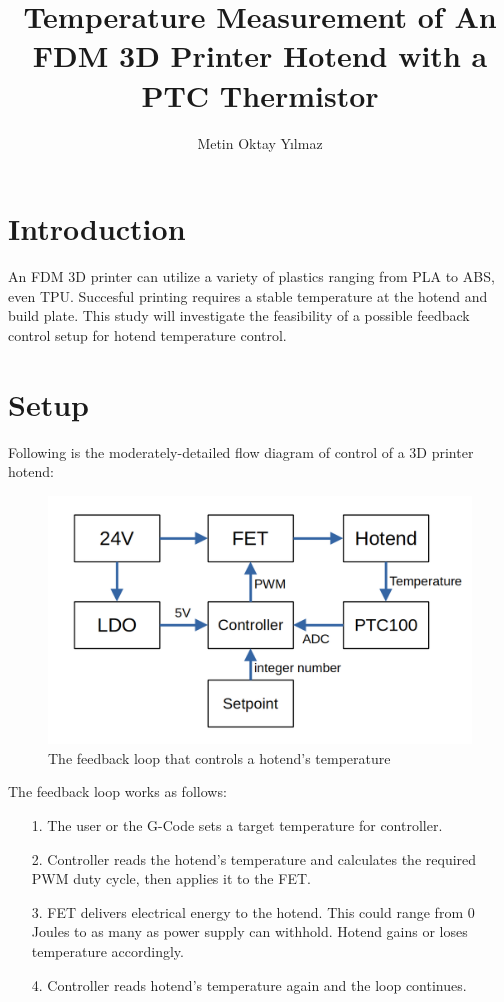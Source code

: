 \documentclass[12pt,a4paper]{report}
\title{Temperature Measurement of An FDM 3D Printer Hotend with a PTC
Thermistor}
\author{Metin Oktay Yılmaz}
\begin{document}
    \maketitle

    \section*{Introduction}
    An FDM 3D printer can utilize a variety of plastics ranging from PLA to
    ABS, even TPU. Succesful printing requires a stable temperature at the
    hotend and build plate. This study will investigate the feasibility of a
    possible feedback control setup for hotend temperature control.

    \section*{Setup}
    Following is the moderately-detailed flow diagram of control of a 3D
    printer hotend:
    \begin{figure}[H]
        \centering
        \includegraphics[scale=0.4]{diagram.png}
        \caption{The feedback loop that controls a hotend's temperature}
    \end{figure}

    The feedback loop works as follows:
    \begin{itemize}
        \item[1.] The user or the G-Code sets a target temperature for
        controller.
        \item[2.] Controller reads the hotend's temperature and calculates the
        required PWM duty cycle, then applies it to the FET.
        \item[3.] FET delivers electrical energy to the hotend. This could
        range from 0 Joules to as many as power supply can withhold. Hotend
        gains or loses temperature accordingly.
        \item[4.] Controller reads hotend's temperature again and the loop
        continues.
    \end{itemize}
\end{document}
